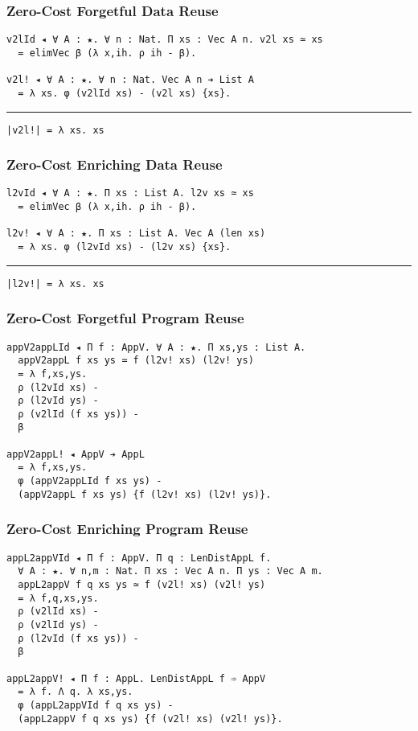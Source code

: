 \documentclass[mathserif,usenames,dvipsnames]{beamer}
\begin{document}
\begin{frame}[fragile]
\frametitle{Zero-Cost Forgetful Data Reuse}

\begin{verbatim}
v2lId ◂ ∀ A : ★. ∀ n : Nat. Π xs : Vec A n. v2l xs ≃ xs 
  = elimVec β (λ x,ih. ρ ih - β).

v2l! ◂ ∀ A : ★. ∀ n : Nat. Vec A n ➔ List A
  = λ xs. φ (v2lId xs) - (v2l xs) {xs}.
\end{verbatim}

\noindent\rule{\textwidth}{1pt}

\begin{verbatim}
|v2l!| = λ xs. xs
\end{verbatim}

\end{frame}

\begin{frame}[fragile]
\frametitle{Zero-Cost Enriching Data Reuse}

\begin{verbatim}
l2vId ◂ ∀ A : ★. Π xs : List A. l2v xs ≃ xs 
  = elimVec β (λ x,ih. ρ ih - β).

l2v! ◂ ∀ A : ★. Π xs : List A. Vec A (len xs)
  = λ xs. φ (l2vId xs) - (l2v xs) {xs}.
\end{verbatim}

\noindent\rule{\textwidth}{1pt}

\begin{verbatim}
|l2v!| = λ xs. xs
\end{verbatim}

\end{frame}

\begin{frame}[fragile]
\frametitle{Zero-Cost Forgetful Program Reuse}

\begin{verbatim}
appV2appLId ◂ Π f : AppV. ∀ A : ★. Π xs,ys : List A. 
  appV2appL f xs ys ≃ f (l2v! xs) (l2v! ys)
  = λ f,xs,ys.        
  ρ (l2vId xs) -      
  ρ (l2vId ys) -      
  ρ (v2lId (f xs ys)) -
  β

appV2appL! ◂ AppV ➔ AppL
  = λ f,xs,ys.
  φ (appV2appLId f xs ys) - 
  (appV2appL f xs ys) {f (l2v! xs) (l2v! ys)}.
\end{verbatim}

\end{frame}

\begin{frame}[fragile]
\frametitle{Zero-Cost Enriching Program Reuse}

\begin{verbatim}
appL2appVId ◂ Π f : AppV. Π q : LenDistAppL f.
  ∀ A : ★. ∀ n,m : Nat. Π xs : Vec A n. Π ys : Vec A m.
  appL2appV f q xs ys ≃ f (v2l! xs) (v2l! ys)
  = λ f,q,xs,ys.      
  ρ (v2lId xs) -      
  ρ (v2lId ys) -      
  ρ (l2vId (f xs ys)) -
  β

appL2appV! ◂ Π f : AppL. LenDistAppL f ➾ AppV
  = λ f. Λ q. λ xs,ys. 
  φ (appL2appVId f q xs ys) - 
  (appL2appV f q xs ys) {f (v2l! xs) (v2l! ys)}.
\end{verbatim}

\end{frame}
\end{document}
